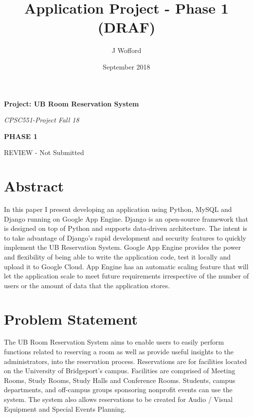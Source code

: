 \documentclass[11pt]{report}
\title{Application Project - Phase 1 (DRAF)}
\author{J Wofford}
\date{September 2018}
\begin{document}
\raggedright


\begin{titlepage}
   \begin{center}
      \Large\textbf{Project: UB Room Reservation System}
      
     \vspace*{3\bigskipamount}
      \large\bfseries\textit{}
      
      \large\textit{CPSC551-Project Fall 18}
      
       \Large\textbf{PHASE 1}
       
       REVIEW - Not Submitted
        
       
   \end{center}
\end{titlepage}

\section*{Abstract}
In this paper I present developing an application using Python, MySQL and Django running on Google App Engine. Django is an open-source framework that is designed on top of Python and supports data-driven architecture.  The intent is to take advantage of Django’s rapid development and security features to quickly implement the UB Reservation System. Google App Engine provides the power and flexibility of being able to write the application code, test it locally and upload it to Google Cloud. App Engine has an automatic scaling feature that will let the application scale to meet future requirements irrespective of the number of users or the amount of data that the application stores.  

\section*{Problem Statement}
The UB Room Reservation System aims to enable users to easily perform functions related to reserving a room as well as provide useful insights to the administrators, into the reservation process.  Reservations are for facilities located on the University of Bridgeport’s campus. Facilities are comprised of Meeting Rooms, Study Rooms, Study Halls and Conference Rooms.  Students, campus departments, and off-campus groups sponsoring nonprofit events can use the system. The system also allows reservations to be created for Audio / Visual Equipment and Special Events Planning. 
\end{document}
